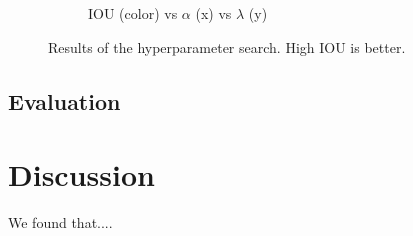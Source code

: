 \begin{figure}[h]
\begin{subfigure}{0.32\textwidth}
         \caption{IOU (color) vs $\alpha$ (x) vs $\lambda$ (y)}
	\end{subfigure}
	\caption[Hyperparameter search for Experiment 3]{Results of the hyperparameter search. High IOU is better.}
	 \label{fig:Hs5}
\end{figure}

\subsection{Evaluation}

\section{Discussion}
We found that....

